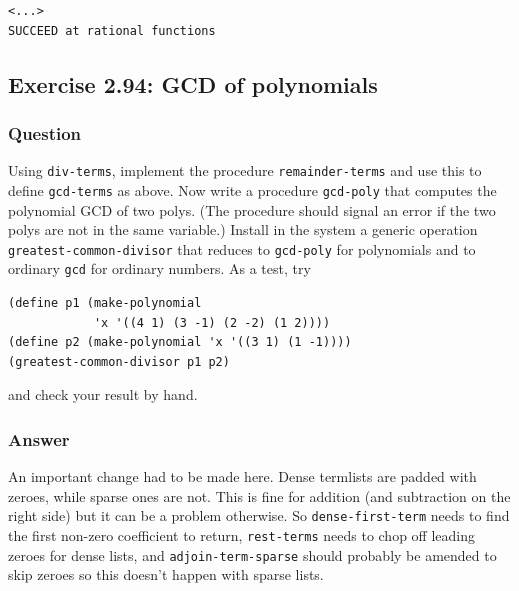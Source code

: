 \documentclass[final,fleqn,titlepage,twoside]{article}
\begin{document}
\begin{verbatim}
<...>
SUCCEED at rational functions
\end{verbatim}

\subsection{Exercise 2.94: GCD of polynomials}
\label{sec:orgb0185a3}

\subsubsection{Question}
\label{sec:org34d7fe5}

Using \texttt{div-terms}, implement the procedure \texttt{remainder-terms}
and use this to define \texttt{gcd-terms} as above. Now write a procedure
\texttt{gcd-poly} that computes the polynomial GCD of two polys. (The
procedure should signal an error if the two polys are not in the same variable.)
Install in the system a generic operation \texttt{greatest-common-divisor}
that reduces to \texttt{gcd-poly} for polynomials and to ordinary
\texttt{gcd} for ordinary numbers. As a test, try

\begin{verbatim}
(define p1 (make-polynomial
            'x '((4 1) (3 -1) (2 -2) (1 2))))
(define p2 (make-polynomial 'x '((3 1) (1 -1))))
(greatest-common-divisor p1 p2)
\end{verbatim}

and check your result by hand.

\subsubsection{Answer}
\label{sec:org40ad362}

An important change had to be made here. Dense termlists are padded with zeroes,
while sparse ones are not. This is fine for addition (and subtraction on the
right side) but it can be a problem otherwise. So \texttt{dense-first-term} needs to
find the first non-zero coefficient to return, \texttt{rest-terms} needs to chop off
leading zeroes for dense lists, and \texttt{adjoin-term-sparse} should probably be
amended to skip zeroes so this doesn't happen with sparse lists.
\end{document}
